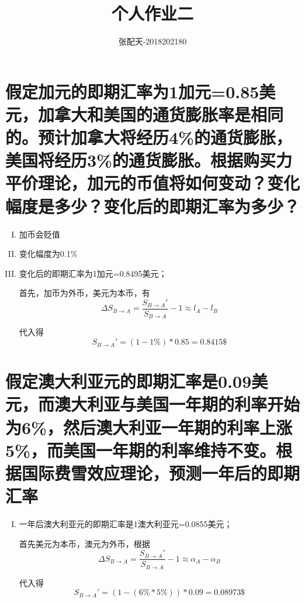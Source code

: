 \documentclass[UTF8]{ctexart}
\title{个人作业二}
\author{张配天-2018202180}
\begin{document}
    \maketitle
    \section{假定加元的即期汇率为1加元=0.85美元，加拿大和美国的通货膨胀率是相同的。预计加拿大将经历4\%的通货膨胀，美国将经历3\%的通货膨胀。根据购买力平价理论，加元的币值将如何变动？变化幅度是多少？变化后的即期汇率为多少？}
    
    \begin{enumerate}[I.]
        \item 加币会贬值
        \item 变化幅度为0.1\%
        \item 变化后的即期汇率为1加元=0.8495美元；\par 首先，加币为外币，美元为本币，有 $$\Delta S_{B\rightarrow A} = \frac{S_{B\rightarrow A}'}{S_{B\rightarrow A}} - 1 \approx l_A - l_B$$\par 代入得\begin{equation}
            S_{B\rightarrow A}' = (1-1\%)*0.85 = 0.8415\$
        \end{equation}
    \end{enumerate}
    
    \section{假定澳大利亚元的即期汇率是0.09美元，而澳大利亚与美国一年期的利率开始为6\%，然后澳大利亚一年期的利率上涨5\%，而美国一年期的利率维持不变。根据国际费雪效应理论，预测一年后的即期汇率}
    \begin{enumerate}[I.]
        \item 一年后澳大利亚元的即期汇率是1澳大利亚元=0.0855美元；\par 首先美元为本币，澳元为外币，根据$$\Delta S_{B\rightarrow A} = \frac{S_{B\rightarrow A}'}{S_{B\rightarrow A}} - 1 \approx \alpha_A - \alpha_B$$\par 代入得\begin{equation}
            S_{B\rightarrow A}' = (1-(6\%*5\%))*0.09 = 0.08973\$
        \end{equation}
    \end{enumerate}
\end{document}
